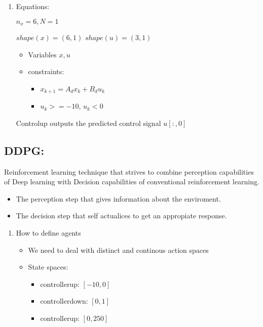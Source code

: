 \documentclass[11pt]{article}
\begin{document}
\begin{enumerate}
\item Equations:
\label{sec:org322142b}

\(n_x = 6, N = 1\)

\(shape(x) = (6, 1)\)
\(shape(u) = (3, 1)\)

\begin{itemize}
    \item Variables $x, u$
    \item constraints:
    \begin{itemize}
        \item $x_{k+1} = A_d x_k + B_d u_k$
        \item $u_k >= -10$, $u_k<0$
    \end{itemize}
\end{itemize}

Controlup outputs the predicted control signal \(u[:,0]\)

\end{enumerate}

\subsection{DDPG:}
\label{sec:orgf2611c4}
Reinforcement learning technique that strives to combine perception capabilities of Deep learning with Decision capabilities of conventional reinforcement learning.

\begin{itemize}
    \item The perception step that gives information about the enviroment.
    \item The decision step that self actualices to get an appropiate response.
\end{itemize}

\begin{enumerate}
\item How to define agents
\label{sec:org99db3f9}

\begin{itemize}
    \item We need to deal with distinct and continous action spaces
    \item State spaces:

    \begin{itemize}
        \item controllerup: $[-10, 0]$
        \item controllerdown: $[0, 1]$
        \item controllerup: $[0, 250]$
    \end{itemize}
\end{itemize}
\end{enumerate}
\end{document}
